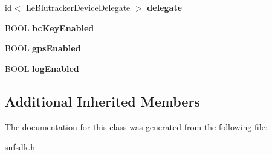 \begin{DoxyCompactItemize}
\item 
\hypertarget{interface_le_blutracker_device_a2f8d73224ba6bd0356eda38dae27104a}{}id$<$ \hyperlink{protocol_le_blutracker_device_delegate-p}{Le\+Blutracker\+Device\+Delegate} $>$ {\bfseries delegate}\label{interface_le_blutracker_device_a2f8d73224ba6bd0356eda38dae27104a}

\item 
\hypertarget{interface_le_blutracker_device_a70f7dd4a7f8e775cbb7a74e8461f8d2e}{}B\+O\+O\+L {\bfseries bc\+Key\+Enabled}\label{interface_le_blutracker_device_a70f7dd4a7f8e775cbb7a74e8461f8d2e}

\item 
\hypertarget{interface_le_blutracker_device_ab7a6538dde4d882aa31477d40f918148}{}B\+O\+O\+L {\bfseries gps\+Enabled}\label{interface_le_blutracker_device_ab7a6538dde4d882aa31477d40f918148}

\item 
\hypertarget{interface_le_blutracker_device_a29f92b734bf228c93415a7af56a19fe2}{}B\+O\+O\+L {\bfseries log\+Enabled}\label{interface_le_blutracker_device_a29f92b734bf228c93415a7af56a19fe2}

\end{DoxyCompactItemize}
\subsection*{Additional Inherited Members}


The documentation for this class was generated from the following file\+:\begin{DoxyCompactItemize}
\item 
snfsdk.\+h\end{DoxyCompactItemize}
